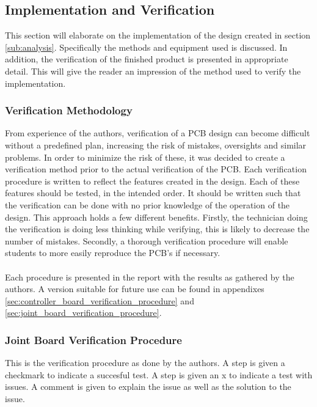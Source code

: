 \subsection{Implementation and Verification} %
\label{sub:implementation_and_verification}
This section will elaborate on the implementation of the design created in section \ref{sub:analysis}.
Specifically the methods and equipment used is discussed.
In addition, the verification of the finished product is presented in appropriate detail.
This will give the reader an impression of the method used to verify the implementation.

\subsubsection{Verification Methodology} %
\label{ssub:testing_methodology}
From experience of the authors, verification of a PCB design can become difficult without a predefined plan, increasing the risk of mistakes, oversights and similar problems.
In order to minimize the risk of these, it was decided to create a verification method prior to the actual verification of the PCB.
Each verification procedure is written to reflect the features created in the design.
Each of these features should be tested, in the intended order.
It should be written such that the verification can be done with no prior knowledge of the operation of the design.
This approach holds a few different benefits.
Firstly, the technician doing the verification is doing less thinking while verifying, this is likely to decrease the number of mistakes.
Secondly, a thorough verification procedure will enable students to more easily reproduce the PCB's if necessary.\\~\\
Each procedure is presented in the report with the results as gathered by the authors.
A version suitable for future use can be found in appendixes \ref{sec:controller_board_verification_procedure} and \ref{sec:joint_board_verification_procedure}.

\subsubsection{Joint Board Verification Procedure} %
\label{ssub:joint_board_verification_methodology}
This is the verification procedure as done by the authors.
A step is given a checkmark to indicate a succesful test.
A step is given an x to indicate a test with issues.
A comment is given to explain the issue as well as the solution to the issue.
